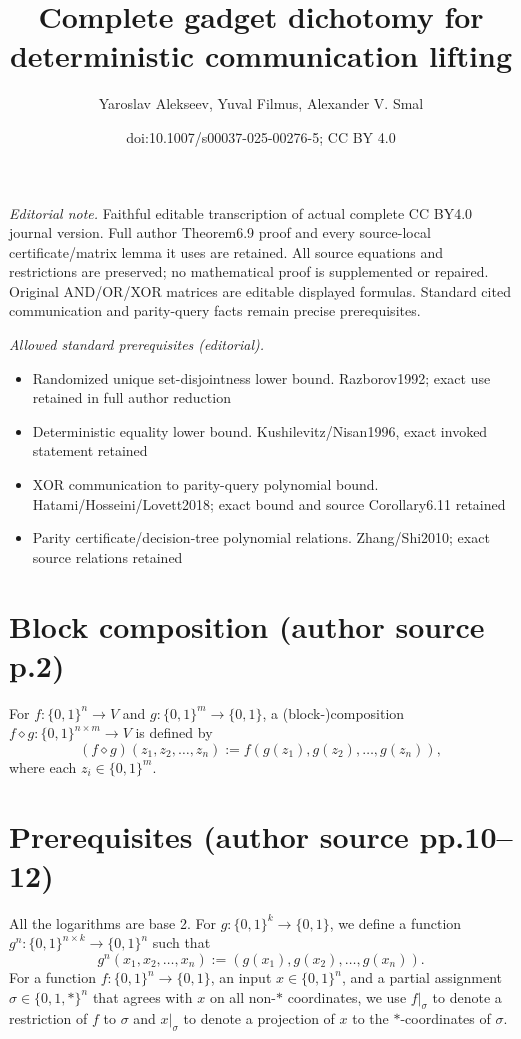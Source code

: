 \documentclass[10pt,a4paper]{article}
\title{Complete gadget dichotomy for deterministic communication lifting}
\author{Yaroslav Alekseev, Yuval Filmus, Alexander V. Smal}
\date{doi:10.1007/s00037-025-00276-5; CC BY 4.0}
\newcommand{\bits}{\{0,1\}}
\newcommand{\comp}{\diamond}
\begin{document}
\maketitle
\noindent\textit{Editorial note.} Faithful editable transcription of actual complete CC BY4.0 journal version. Full author Theorem6.9 proof and every source-local certificate/matrix lemma it uses are retained. All source equations and restrictions are preserved; no mathematical proof is supplemented or repaired. Original AND/OR/XOR matrices are editable displayed formulas. Standard cited communication and parity-query facts remain precise prerequisites.\par\medskip
\noindent\textit{Allowed standard prerequisites (editorial).}\begin{itemize}
\item Randomized unique set-disjointness lower bound. Razborov1992; exact use retained in full author reduction
\item Deterministic equality lower bound. Kushilevitz/Nisan1996, exact invoked statement retained
\item XOR communication to parity-query polynomial bound. Hatami/Hosseini/Lovett2018; exact bound and source Corollary6.11 retained
\item Parity certificate/decision-tree polynomial relations. Zhang/Shi2010; exact source relations retained
\end{itemize}\medskip
\section*{Block composition (author source p.2)}
For $f:\bits^n\to V$ and $g:\bits^m\to\bits$, a (block-)composition $f\comp g:\bits^{n\times m}\to V$ is defined by
\[(f\comp g)(z_1,z_2,\ldots,z_n):=f(g(z_1),g(z_2),\ldots,g(z_n)),\]
where each $z_i\in\bits^m$.
\section*{Prerequisites (author source pp.10--12)}
All the logarithms are base 2. For $g:\bits^k\to\bits$, we define a function $g^n:\bits^{n\times k}\to\bits^n$ such that
\[g^n(x_1,x_2,\ldots,x_n):=(g(x_1),g(x_2),\ldots,g(x_n)).\]
For a function $f:\bits^n\to\bits$, an input $x\in\bits^n$, and a partial assignment $\sigma\in\{0,1,*\}^n$ that agrees with $x$ on all non-$*$ coordinates, we use $f|_\sigma$ to denote a restriction of $f$ to $\sigma$ and $x|_\sigma$ to denote a projection of $x$ to the $*$-coordinates of $\sigma$.
\end{document}
